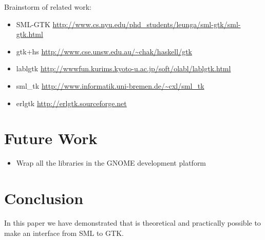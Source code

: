 \documentclass[workingdraft,endnotes]{usetex-v1}
\begin{document}
 Brainstorm of related work:
\begin{itemize}
\item SML-GTK 
\url{http://www.cs.nyu.edu/phd_students/leunga/sml-gtk/sml-gtk.html}

\item gtk+hs
\url{http://www.cse.unsw.edu.au/~chak/haskell/gtk}

\item lablgtk
\url{http://wwwfun.kurims.kyoto-u.ac.jp/soft/olabl/lablgtk.html}

\item sml\_tk
\url{http://www.informatik.uni-bremen.de/~cxl/sml_tk}

\item erlgtk
\url{http://erlgtk.sourceforge.net}

\end{itemize}



\section{Future Work}
\label{sec:future-work}

\begin{itemize}
\item Wrap all the libraries in the GNOME development platform
\end{itemize}



\section{Conclusion}
\label{sec:conclusion}

In this paper we have demonstrated that is theoretical and practically
possible to make an interface from SML to GTK.



\end{document}
